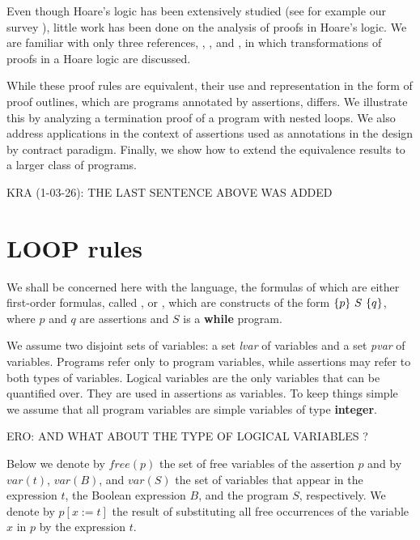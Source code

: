 \documentclass[runningheads]{llncs}       %
\begin{document}
Even though Hoare's logic has been extensively studied (see for
example our survey \cite{AO19}), little work has been done on the
analysis of proofs in Hoare's logic. We are familiar with only three
references, \cite{Apt81a}, \cite{GR16}, and \cite{Tiu02}, in which
transformations of proofs in a Hoare logic are discussed.

While these proof rules are equivalent, their use and representation
in the form of proof outlines, which are programs annotated by
assertions, differs. We illustrate this by analyzing a termination
proof of a program with nested loops. We also address applications in
the context of assertions used as annotations in the design by
contract paradigm.
Finally, we show how to extend the equivalence results to a larger class of programs.

\III

\NI
KRA (1-03-26): THE LAST SENTENCE ABOVE WAS ADDED

\section{LOOP rules}

We shall be concerned here with the language, the formulas of
which are either first-order formulas, called , or
, which are constructs of the form $\mbox{$\{{p}\}\ {S}\ \{{q}\}$}$,
where $p$ and $q$ are assertions and $S$ is a \textbf{while} program.

We assume two disjoint sets of variables: a set \emph{lvar} of
 variables and a set \emph{pvar} of 
variables. Programs refer only to program variables, while assertions
may refer to both types of variables.  Logical variables are the only
variables that can be quantified over. They are used in assertions as
 variables.
To keep things simple we assume that all program variables are simple
variables of  type \textbf{integer}.

ERO: AND WHAT ABOUT THE TYPE OF LOGICAL VARIABLES ?

\III

Below we denote by $\mathit{free}(p)$
the set of free variables of the assertion $p$ and by $var(t)$, $var(B)$, and $var(S)$ 
the set of variables that appear in the
expression $t$, the Boolean expression $B$, and the program $S$, respectively.
%
% 
%
We denote by $p[x:=t]$ the result of substituting all free occurrences
of the variable $x$ in $p$ by the expression $t$. 
\end{document}
